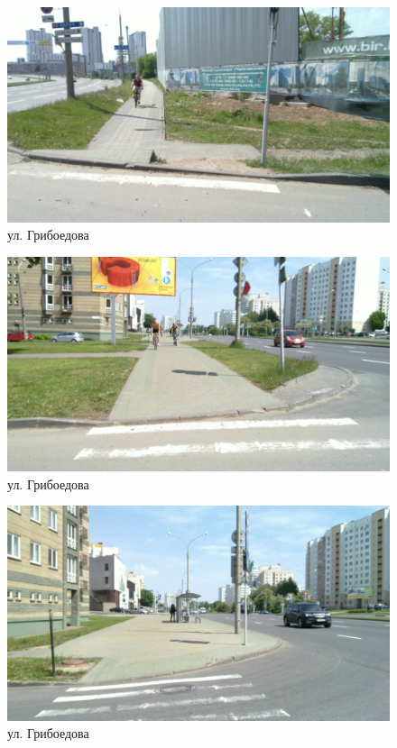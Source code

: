 \documentclass[a4paper,14pt,twoside]{extarticle}
\begin{document}
\begin{figure}[h!]
    \centering
    \includegraphics[width=\textwidth]{Pictures/1000000000000A00000005A0A7B34678.jpg}
    \caption{ул. Грибоедова}
\end{figure}

\begin{figure}[h!]
    \centering
    \includegraphics[width=\textwidth]{Pictures/1000000000000A00000005A04FA06081.jpg}
    \caption{ул. Грибоедова}
\end{figure}

\begin{figure}[h!]
    \centering
    \includegraphics[width=\textwidth]{Pictures/1000000000000A00000005A0247D0B4C.jpg}
    \caption{ул. Грибоедова}
\end{figure}
\end{document}
